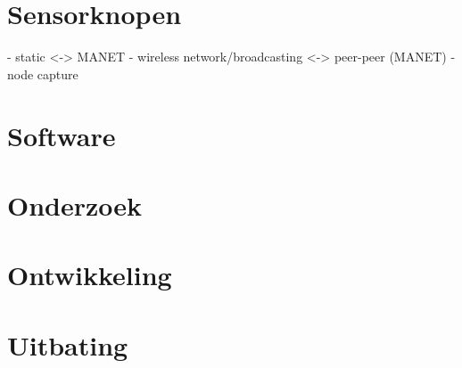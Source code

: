 \section{Sensorknopen}
\label{section:problem-hardware}

\TODO

- static <-> MANET
- wireless network/broadcasting <-> peer-peer (MANET)
- node capture

\section{Software}
\label{section:problem-software}

\TODO

\section{Onderzoek}
\label{section:problem-research}

\TODO

\section{Ontwikkeling}
\label{section:problem-develop}

\TODO

\section{Uitbating}
\label{section:problem-operations}

\TODO
